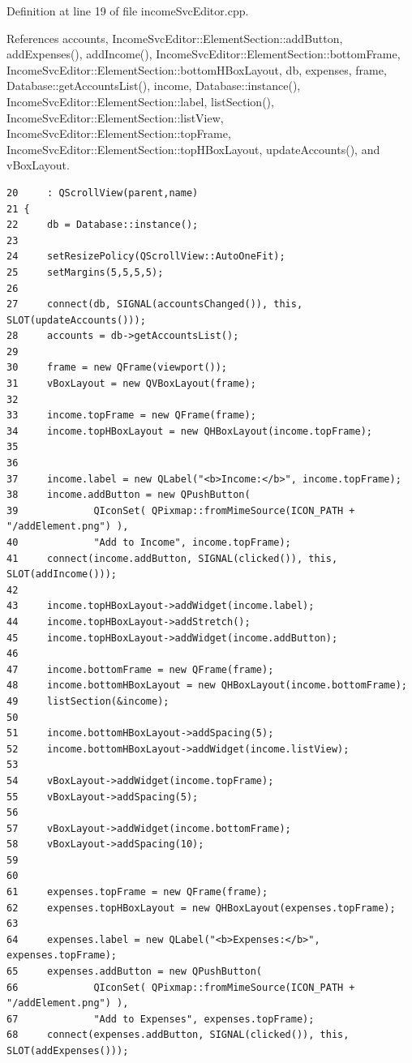 Definition at line 19 of file income\-Svc\-Editor.cpp.

References accounts, Income\-Svc\-Editor::Element\-Section::add\-Button, add\-Expenses(), add\-Income(), Income\-Svc\-Editor::Element\-Section::bottom\-Frame, Income\-Svc\-Editor::Element\-Section::bottom\-HBox\-Layout, db, expenses, frame, Database::get\-Accounts\-List(), income, Database::instance(), Income\-Svc\-Editor::Element\-Section::label, list\-Section(), Income\-Svc\-Editor::Element\-Section::list\-View, Income\-Svc\-Editor::Element\-Section::top\-Frame, Income\-Svc\-Editor::Element\-Section::top\-HBox\-Layout, update\-Accounts(), and v\-Box\-Layout.

\footnotesize\begin{verbatim}20     : QScrollView(parent,name)
21 {
22     db = Database::instance();
23     
24     setResizePolicy(QScrollView::AutoOneFit);
25     setMargins(5,5,5,5);
26     
27     connect(db, SIGNAL(accountsChanged()), this, SLOT(updateAccounts()));
28     accounts = db->getAccountsList();
29    
30     frame = new QFrame(viewport());
31     vBoxLayout = new QVBoxLayout(frame);
32     
33     income.topFrame = new QFrame(frame);
34     income.topHBoxLayout = new QHBoxLayout(income.topFrame);
35     
36     
37     income.label = new QLabel("<b>Income:</b>", income.topFrame);
38     income.addButton = new QPushButton(
39             QIconSet( QPixmap::fromMimeSource(ICON_PATH + "/addElement.png") ),
40             "Add to Income", income.topFrame);
41     connect(income.addButton, SIGNAL(clicked()), this, SLOT(addIncome()));
42 
43     income.topHBoxLayout->addWidget(income.label);
44     income.topHBoxLayout->addStretch();
45     income.topHBoxLayout->addWidget(income.addButton);
46     
47     income.bottomFrame = new QFrame(frame);
48     income.bottomHBoxLayout = new QHBoxLayout(income.bottomFrame);
49     listSection(&income);
50     
51     income.bottomHBoxLayout->addSpacing(5);
52     income.bottomHBoxLayout->addWidget(income.listView);
53     
54     vBoxLayout->addWidget(income.topFrame);
55     vBoxLayout->addSpacing(5);
56 
57     vBoxLayout->addWidget(income.bottomFrame);
58     vBoxLayout->addSpacing(10);
59    
60 
61     expenses.topFrame = new QFrame(frame);
62     expenses.topHBoxLayout = new QHBoxLayout(expenses.topFrame);
63     
64     expenses.label = new QLabel("<b>Expenses:</b>", expenses.topFrame);
65     expenses.addButton = new QPushButton(
66             QIconSet( QPixmap::fromMimeSource(ICON_PATH + "/addElement.png") ),
67             "Add to Expenses", expenses.topFrame);
68     connect(expenses.addButton, SIGNAL(clicked()), this, SLOT(addExpenses()));

\end{verbatim}
